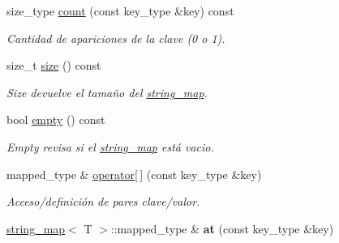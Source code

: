 \begin{DoxyCompactItemize}
\item 
size\+\_\+type \hyperlink{classstring__map_a7eb4798cb06e5fb6eecc51a7de9d9a16}{count} (const key\+\_\+type \&key) const 
\begin{DoxyCompactList}\small\item\em Cantidad de apariciones de la clave (0 o 1). \end{DoxyCompactList}\item 
size\+\_\+t \hyperlink{classstring__map_af6a00aaeaf63ed9798c403e714a4be0c}{size} () const 
\begin{DoxyCompactList}\small\item\em Size devuelve el tamaño del \hyperlink{classstring__map}{string\+\_\+map}. \end{DoxyCompactList}\item 
bool \hyperlink{classstring__map_a9a83f6f168f104c5d6c05c3fb989ad1f}{empty} () const 
\begin{DoxyCompactList}\small\item\em Empty revisa si el \hyperlink{classstring__map}{string\+\_\+map} está vacio. \end{DoxyCompactList}\item 
mapped\+\_\+type \& \hyperlink{classstring__map_aa018c2602a9a5af3255a443c79ea2183}{operator\mbox{[}$\,$\mbox{]}} (const key\+\_\+type \&key)
\begin{DoxyCompactList}\small\item\em Acceso/definición de pares clave/valor. \end{DoxyCompactList}\item 
\hypertarget{classstring__map_afcc707f585755be24ffc4b06149f1cec}{\hyperlink{classstring__map}{string\+\_\+map}$<$ T $>$\+::mapped\+\_\+type \& {\bfseries at} (const key\+\_\+type \&key)}\label{classstring__map_afcc707f585755be24ffc4b06149f1cec}


\end{DoxyCompactItemize}
